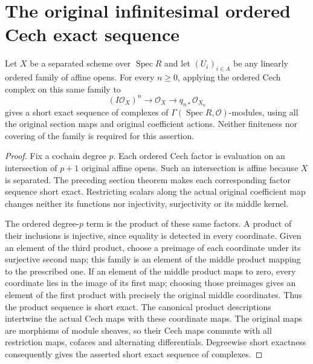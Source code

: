 \section{The original infinitesimal ordered Cech exact sequence}

\begin{theorem}
\label{thm:fibre-infinitesimal-ordered-cech-short-exact}
\leanok
Let $X$ be a separated scheme over $\operatorname{Spec}R$ and let
$(U_i)_{i\in A}$ be any linearly ordered family of affine opens. For
every $n\ge0$, applying the ordered Cech complex on this same family to
\[
 (I\mathcal O_X)^n\longrightarrow\mathcal O_X
 \longrightarrow q_{n*}\mathcal O_{X_n}
\]
gives a short exact sequence of complexes of
$\Gamma(\operatorname{Spec}R,\mathcal O)$-modules, using all the original
section maps and original coefficient actions. Neither finiteness nor
covering of the family is required for this assertion.
\end{theorem}
\begin{proof}
Fix a cochain degree $p$. Each ordered Cech factor is evaluation on an
intersection of $p+1$ original affine opens. Such an intersection is
affine because $X$ is separated. The preceding section theorem makes
each corresponding factor sequence short exact. Restricting scalars
along the actual original coefficient map changes neither its
functions nor injectivity, surjectivity or its middle kernel.

The ordered degree-$p$ term is the product of these same factors.
A product of their inclusions is injective, since equality is detected
in every coordinate. Given an element of the third product, choose a
preimage of each coordinate under its surjective second map; this
family is an element of the middle product mapping to the prescribed
one. If an element of the middle product maps to zero, every coordinate
lies in the image of its first map; choosing those preimages gives an
element of the first product with precisely the original middle
coordinates. Thus the product sequence is short exact. The canonical
product descriptions intertwine the actual Cech maps with these
coordinate maps. The original maps are morphisms of module sheaves,
so their Cech maps commute with all restriction maps, cofaces and
alternating differentials. Degreewise short exactness consequently
gives the asserted short exact sequence of complexes.
\end{proof}


